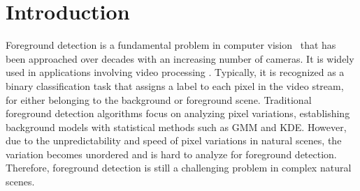 \documentclass[journal]{IEEEtran}
\begin{document}
\section{Introduction}
Foreground detection is a fundamental problem in computer vision\ \cite{Bouwmans201431} that has been approached over decades with an increasing number of cameras.
It is widely used in applications involving video processing \cite{Barnich2011_2011_TIP}.
Typically, it is recognized as a binary classification task that assigns a label to each pixel in the video stream,
for either belonging to the background or foreground scene.
Traditional foreground detection algorithms focus on analyzing pixel variations, establishing background models with statistical methods such as GMM\cite{Stauffer1999}\cite{lee2005} and KDE\cite{Elgammal2000Non}\cite{Mittal2004KDE}.
However, due to the unpredictability and speed of pixel variations in natural scenes,
the variation becomes unordered and is hard to analyze for foreground detection.
Therefore, foreground detection is still a challenging problem in complex natural scenes.
%
%

\end{document}
